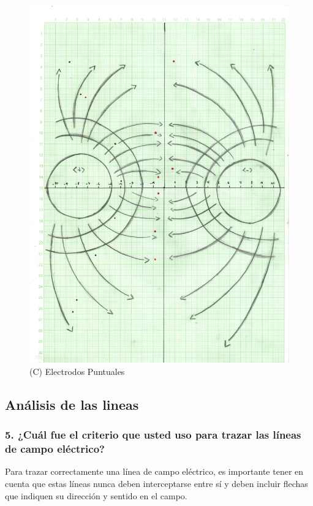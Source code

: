 \documentclass[letterpaper, 12pt]{report}
\begin{document}
\begin{figure}[H]
	\begin{center}
		\includegraphics[scale = 0.7]{./Images/Puntuales.jpg}
		\caption{(C) Electrodos Puntuales}
	\end{center}
\end{figure}

\subsection{Análisis de las lineas}

\subsubsection{5. ¿Cuál fue el criterio que usted uso para trazar las líneas
	de campo eléctrico?}

Para trazar correctamente una línea de campo eléctrico, es
importante tener en cuenta que estas líneas nunca deben
interceptarse entre sí y deben incluir flechas que indiquen
su dirección y sentido en el campo.
\end{document}
